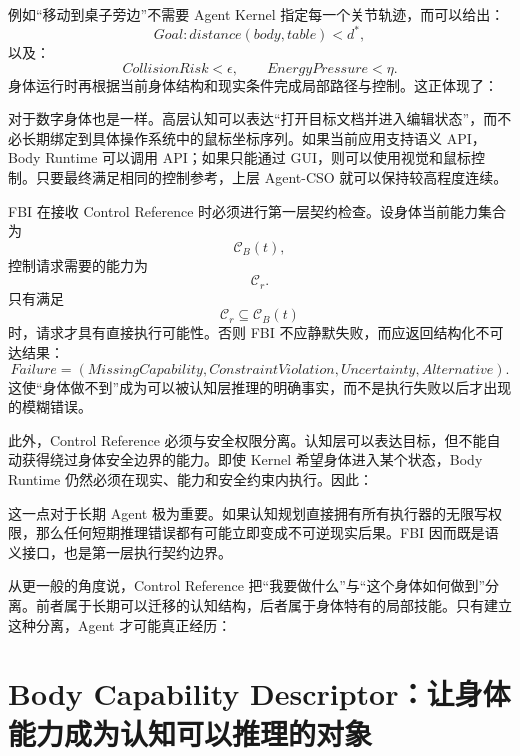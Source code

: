 例如“移动到桌子旁边”不需要 Agent Kernel 指定每一个关节轨迹，而可以给出：
\[
Goal:
distance(body,table)<d^\ast,
\]
以及：
\[
CollisionRisk<\epsilon,
\qquad
EnergyPressure<\eta.
\]
身体运行时再根据当前身体结构和现实条件完成局部路径与控制。这正体现了：
\begin{statementbox}
\centering
{}
\end{statementbox}

对于数字身体也是一样。高层认知可以表达“打开目标文档并进入编辑状态”，而不必长期绑定到具体操作系统中的鼠标坐标序列。如果当前应用支持语义 API，Body Runtime 可以调用 API；如果只能通过 GUI，则可以使用视觉和鼠标控制。只要最终满足相同的控制参考，上层 Agent-CSO 就可以保持较高程度连续。

FBI 在接收 Control Reference 时必须进行第一层契约检查。设身体当前能力集合为
\[
\mathcal C_B(t),
\]
控制请求需要的能力为
\[
\mathcal C_r.
\]
只有满足
\[
\mathcal C_r
\subseteq
\mathcal C_B(t)
\]
时，请求才具有直接执行可能性。否则 FBI 不应静默失败，而应返回结构化不可达结果：
\[
Failure
=
(
MissingCapability,
ConstraintViolation,
Uncertainty,
Alternative
).
\]
这使“身体做不到”成为可以被认知层推理的明确事实，而不是执行失败以后才出现的模糊错误。

此外，Control Reference 必须与安全权限分离。认知层可以表达目标，但不能自动获得绕过身体安全边界的能力。即使 Kernel 希望身体进入某个状态，Body Runtime 仍然必须在现实、能力和安全约束内执行。因此：
\begin{statementbox}
\centering
{}
\end{statementbox}

这一点对于长期 Agent 极为重要。如果认知规划直接拥有所有执行器的无限写权限，那么任何短期推理错误都有可能立即变成不可逆现实后果。FBI 因而既是语义接口，也是第一层执行契约边界。

从更一般的角度说，Control Reference 把“我要做什么”与“这个身体如何做到”分离。前者属于长期可以迁移的认知结构，后者属于身体特有的局部技能。只有建立这种分离，Agent 才可能真正经历：
\begin{statementbox}
\centering
{}
\end{statementbox}


\section{Body Capability Descriptor：让身体能力成为认知可以推理的对象}

